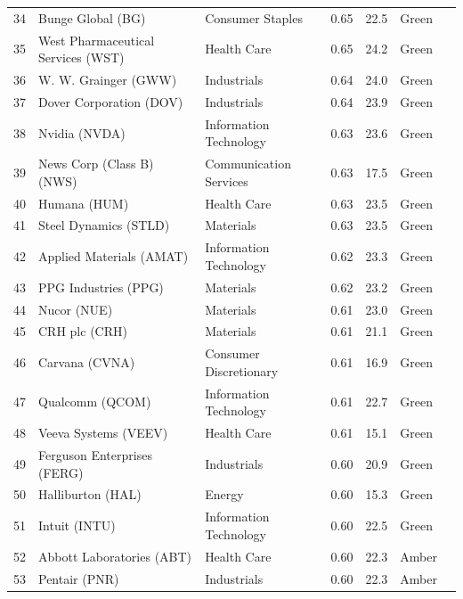\documentclass[11pt,a4paper]{article}
\begin{document}
{\begin{longtable}{r p{4.4cm} p{2.8cm} r r l l}
34 & Bunge Global (BG) & Consumer Staples & 0.65 & 22.5 & \cellcolor[HTML]{C6EFCE}Green &  \\
35 & West Pharmaceutical Services (WST) & Health Care & 0.65 & 24.2 & \cellcolor[HTML]{C6EFCE}Green &  \\
36 & W. W. Grainger (GWW) & Industrials & 0.64 & 24.0 & \cellcolor[HTML]{C6EFCE}Green &  \\
37 & Dover Corporation (DOV) & Industrials & 0.64 & 23.9 & \cellcolor[HTML]{C6EFCE}Green &  \\
38 & Nvidia (NVDA) & Information Technology & 0.63 & 23.6 & \cellcolor[HTML]{C6EFCE}Green &  \\
39 & News Corp (Class B) (NWS) & Communication Services & 0.63 & 17.5 & \cellcolor[HTML]{C6EFCE}Green &  \\
40 & Humana (HUM) & Health Care & 0.63 & 23.5 & \cellcolor[HTML]{C6EFCE}Green &  \\
41 & Steel Dynamics (STLD) & Materials & 0.63 & 23.5 & \cellcolor[HTML]{C6EFCE}Green &  \\
42 & Applied Materials (AMAT) & Information Technology & 0.62 & 23.3 & \cellcolor[HTML]{C6EFCE}Green &  \\
43 & PPG Industries (PPG) & Materials & 0.62 & 23.2 & \cellcolor[HTML]{C6EFCE}Green &  \\
44 & Nucor (NUE) & Materials & 0.61 & 23.0 & \cellcolor[HTML]{C6EFCE}Green &  \\
45 & CRH plc (CRH) & Materials & 0.61 & 21.1 & \cellcolor[HTML]{C6EFCE}Green &  \\
46 & Carvana (CVNA) & Consumer Discretionary & 0.61 & 16.9 & \cellcolor[HTML]{C6EFCE}Green &  \\
47 & Qualcomm (QCOM) & Information Technology & 0.61 & 22.7 & \cellcolor[HTML]{C6EFCE}Green &  \\
48 & Veeva Systems (VEEV) & Health Care & 0.61 & 15.1 & \cellcolor[HTML]{C6EFCE}Green &  \\
49 & Ferguson Enterprises (FERG) & Industrials & 0.60 & 20.9 & \cellcolor[HTML]{C6EFCE}Green &  \\
50 & Halliburton (HAL) & Energy & 0.60 & 15.3 & \cellcolor[HTML]{C6EFCE}Green &  \\
51 & Intuit (INTU) & Information Technology & 0.60 & 22.5 & \cellcolor[HTML]{C6EFCE}Green &  \\
52 & Abbott Laboratories (ABT) & Health Care & 0.60 & 22.3 & \cellcolor[HTML]{FFEB9C}Amber &  \\
53 & Pentair (PNR) & Industrials & 0.60 & 22.3 & \cellcolor[HTML]{FFEB9C}Amber &  \\

\end{longtable}}
\end{document}
